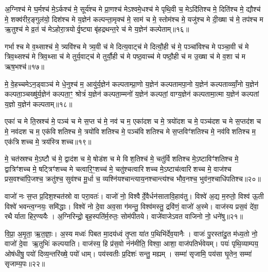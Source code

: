 {\anuvakamend[{गृ॒हाश्च॒ षोड॑श च॥८॥}]}

अ॒ग्निश्च॑ मे घ॒र्मश्च॑ मे॒ऽर्कश्च॑ मे॒ सूर्य॑श्च मे प्रा॒णश्च॑ मेऽश्वमे॒धश्च॑ मे पृथि॒वी च॒ मेऽदि॑तिश्च मे॒ दिति॑श्च मे॒ द्यौश्च॑ मे॒ शक्व॑रीर॒ङ्गुल॑यो॒ दिश॑श्च मे य॒ज्ञेन॑ कल्पन्ता॒मृक्च॑ मे॒ साम॑ च मे॒ स्तोम॑श्च मे॒ यजु॑श्च मे दी॒ख्षा च॑ मे॒ तप॑श्च म ऋ॒तुश्च॑ मे व्र॒तं च॑ मेऽहोरा॒त्रयोर्वृ॒ष्ट्या बृ॑हद्रथन्त॒रे च॑ मे य॒ज्ञेन॑ कल्पेताम्॥१६॥

{\anuvakamend[{दी॒ख्षाऽष्टाद॑श च॥९॥}]}

गर्भाश्च मे व॒थ्साश्च॑ मे॒ त्र्यवि॑श्च मे त्र्य॒वी च॑ मे दित्य॒वाट्च॑ मे दित्यौ॒ही च॑ मे॒ पञ्चा॑विश्च मे पञ्चा॒वी च॑ मे त्रिव॒थ्सश्च॑ मे त्रिव॒थ्सा च॑ मे तुर्य॒वाट्च॑ मे तुर्यौ॒ही च॑ मे पष्ठ॒वाच्च॑ मे पष्ठौ॒ही च॑ म उ॒ख्षा च॑ मे व॒शा च॑ म ऋष॒भश्च॑॥१७॥

मे॒ वे॒हच्चमेऽन॒ड्वाञ्च॑ मे धे॒नुश्च॑ म॒ आयु॑र्य॒ज्ञेन॑ कल्पताम्प्रा॒णो य॒ज्ञेन॑ कल्पतामपा॒नो य॒ज्ञेन॑ कल्पताव्व्याँ॒नो य॒ज्ञेन॑ कल्पता॒ञ्चख्षु॑र्य॒ज्ञेन॑ कल्पता॒ꣳ॒ श्रोत्रं॑ य॒ज्ञेन॑ कल्पता॒म्मनो॑ य॒ज्ञेन॑ कल्पतां॒ वाग्य॒ज्ञेन॑ कल्पतामा॒त्मा य॒ज्ञेन॑ कल्पतां य॒ज्ञो य॒ज्ञेन॑ कल्पताम्॥१८॥

{\anuvakamend[{ऋ॒ष॒भश्च॑ चत्वारि॒ꣳ॒शच्च॑॥10॥}]}

एका॑ च मे ति॒स्रश्च॑ मे॒ पञ्च॑ च मे स॒प्त च॑ मे॒ नव॑ च म॒ एका॑दश च मे॒ त्रयो॑दश च मे॒ पञ्च॑दश च मे स॒प्तद॑श च मे॒ नव॑दश च म॒ एक॑विशतिश्च मे॒ त्रयो॑विशतिश्च मे॒ पञ्च॑विशतिश्च मे स॒प्तविꣳ॑शतिश्च मे॒ नव॑विशतिश्च म॒ एक॑त्रिशच्च मे॒ त्रय॑स्त्रिशच्च॥१९॥

मे॒ चत॑स्रश्च मे॒ऽष्टौ च॑ मे॒ द्वाद॑श च मे॒ षोड॑श च मे विश॒तिश्च॑ मे॒ चतु॑र्विशतिश्च मे॒ऽष्टाविꣳ॑शतिश्च मे॒ द्वात्रिꣳ॑शच्च मे॒ षट्त्रिꣳ॑शच्च मे चत्वारि॒ꣳ॒शच्च॑ मे॒ चतु॑श्चत्वारिशच्च मे॒ऽष्टाच॑त्वारिशच्च मे॒ वाज॑श्च प्रस॒वश्चा॑पि॒जश्च॒ क्रतु॑श्च॒ सुव॑श्च मू॒र्धा च॒ व्यश्नि॑यश्चान्त्याय॒नश्चान्त्य॑श्च भौव॒नश्च॒ भुव॑न॒श्चाधि॑पतिश्च॥२०॥

{\anuvakamend[{त्रय॑स्त्रिशच्च॒ व्यश्ञि॑य॒ एका॑दश च॥11॥}]}

वाजो॑ नः स॒प्त प्र॒दिश॒श्चत॑स्रो वा परा॒वतः॑। वाजो॑ नो॒ विश्वैर्दे॒वैर्धन॑सातावि॒हाव॑तु। विश्वे॑ अ॒द्य म॒रुतो॒ विश्व॑ ऊ॒ती विश्वे॑ भवन्त्व॒ग्नयः॒ समि॑द्धाः। विश्वे॑ नो दे॒वा अव॒सा ग॑मन्तु॒ विश्व॑मस्तु॒ द्रवि॑णं॒ वाजो॑ अ॒स्मे। वाज॑स्य प्रस॒वं दे॑वा॒ रथैर्याता हिर॒ण्ययैः। अ॒ग्निरिन्द्रो॒ बृह॒स्पति॑र्म॒रुतः॒ सोम॑पीतये। वाजे॑वाजेऽवत वाजिनो नो॒ धने॑षु॥२१॥

वि॒प्रा॒ अ॒मृ॒ता॒ ऋ॒त॒ज्ञाः॒। अ॒स्य मध्वः॑ पिबत मा॒दय॑ध्वं तृ॒प्ता या॑त प॒थिभि॑र्देव॒यानैः। वाजः॑ पु॒रस्ता॑दु॒त म॑ध्य॒तो नो॒ वाजो॑ दे॒वा ऋ॒तुभिः॑ कल्पयाति। वाज॑स्य॒ हि प्र॑स॒वो नंन॑मीति॒ विश्वा॒ आशा॒ वाज॑पतिर्भवेयम्। पयः॑ पृथि॒व्याम्पय॒ ओष॑धीषु॒ पयो॑ दिव्य॒न्तरि॑ख्षे॒ पयो॑ धाम्। पय॑स्वतीः प्र॒दिशः॑ सन्तु॒ मह्यम्। सम्मा॑ सृजामि॒ पय॑सा घृ॒तेन॒ सम्मा॑ सृजाम्य॒पः॥२२॥

